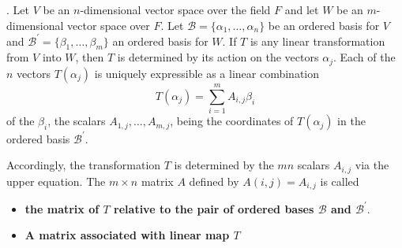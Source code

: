 \documentclass[8pt]{beamer}
\newcommand{\mc}[1]{\mathcal{#1}}
\newcommand{\tb}[1]{\textbf{#1}}
\begin{document}
\begin{frame}{.}
    Let $V$ be an $n$-dimensional vector space over the field $F$ and let $W$ be an $m$-dimensional vector space over $F$.
    Let $\mc{B} = \{\alpha_1, \dots, \alpha_n\}$ be an ordered basis for $V$ and $\mc{B}^\prime = \{\beta_1, \dots, \beta_m\}$ an ordered basis for $W$.
    If $T$ is any linear transformation from $V$ into $W$, then $T$ is determined by its action on the vectors $\alpha_j$.
    Each of the $n$ vectors $T(\alpha_j)$ is uniquely expressible as a linear combination
    \[
        T(\alpha_j) = \sum_{i=1}^m A_{i,j} \beta_i
    \]
    of the $\beta_i$, the scalars $A_{1,j}, \dots, A_{m,j}$, being the coordinates of $T(\alpha_j)$ in the ordered basis $\mc{B}^\prime$.

    Accordingly, the transformation $T$ is determined by the $mn$ scalars $A_{i,j}$ via the upper equation.
    The $m \times n$ matrix $A$ defined by $A(i,j) = A_{i,j}$ is called 
    \begin{itemize}
        \item \tb{the matrix of $T$ relative to the pair of ordered bases $\mc{B}$ and $\mc{B}^\prime$}.
        \item \tb{A matrix associated with linear map $T$}
    \end{itemize}
\end{frame}
\end{document}
